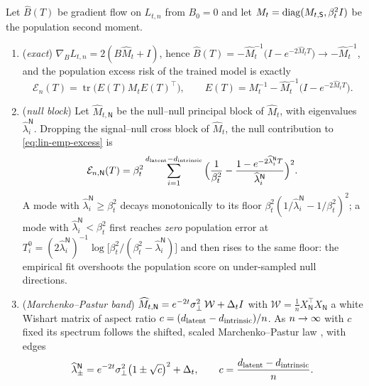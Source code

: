 \begin{proposition}\label{prop:lin-emp}
Let $\widehat B(T)$ be gradient flow on $L_{t,n}$ from $B_0=0$ and let $M_t=\operatorname{diag}(M_{t,\mathsf S},\beta_t^2I)$ be the population second moment.
\begin{enumerate}
\item[(a)] (\emph{exact}) $\nabla_BL_{t,n}=2(B\widehat M_t+I)$, hence $\widehat B(T)=-\widehat M_t^{-1}\big(I-e^{-2\widehat M_tT}\big)\to-\widehat M_t^{-1}$, and the population excess risk of the trained model is exactly
\begin{equation}\label{eq:lin-emp-excess}
\mathcal E_n(T)=\operatorname{tr}\big(E(T)M_tE(T)^{\top}\big),\qquad E(T)=M_t^{-1}-\widehat M_t^{-1}\big(I-e^{-2\widehat M_tT}\big).
\end{equation}
\item[(b)] (\emph{null block}) Let $\widehat M_{t,\mathsf N}$ be the null--null principal block of $\widehat M_t$, with eigenvalues $\widehat\lambda^{\mathsf N}_i$. Dropping the signal--null cross block of $\widehat M_t$, the null contribution to \eqref{eq:lin-emp-excess} is
\begin{equation}\label{eq:lin-emp-null}
\mathcal E_{n,\mathsf N}(T)=\beta_t^2\sum_{i=1}^{d_{\mathrm{latent}}-d_{\mathrm{intrinsic}}}\Big(\frac1{\beta_t^2}-\frac{1-e^{-2\widehat\lambda^{\mathsf N}_iT}}{\widehat\lambda^{\mathsf N}_i}\Big)^2 .
\end{equation}
A mode with $\widehat\lambda^{\mathsf N}_i\ge\beta_t^2$ decays monotonically to its floor $\beta_t^2(1/\widehat\lambda^{\mathsf N}_i-1/\beta_t^2)^2$; a mode with $\widehat\lambda^{\mathsf N}_i<\beta_t^2$ first reaches \emph{zero} population error at $T^0_i=(2\widehat\lambda^{\mathsf N}_i)^{-1}\log\big[\beta_t^2/(\beta_t^2-\widehat\lambda^{\mathsf N}_i)\big]$ and then rises to the same floor: the empirical fit overshoots the population score on under-sampled null directions.
\item[(c)] (\emph{Marchenko--Pastur band}) $\widehat M_{t,\mathsf N}=e^{-2t}\sigma_{\perp}^2\,\mathcal W+\Delta_tI$ with $\mathcal W=\frac1n X_{\mathsf N}^{\top}X_{\mathsf N}$ a white Wishart matrix of aspect ratio $c=(d_{\mathrm{latent}}-d_{\mathrm{intrinsic}})/n$. As $n\to\infty$ with $c$ fixed its spectrum follows the shifted, scaled Marchenko--Pastur law \citep{marchenko1967distribution,couillet2011rmt}, with edges
\begin{equation}\label{eq:lin-mp-edges}
\widehat\lambda^{\mathsf N}_\pm=e^{-2t}\signoise^2\big(1\pm\sqrt{c}\big)^2+\Delta_t,\qquad c=\frac{\dlat-\dint}{\nsamp}.

\end{equation}
\end{enumerate}
\end{proposition}
